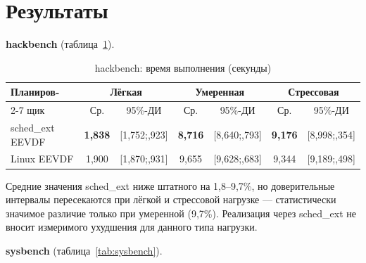 \documentclass[12pt, oneside]{book}
\newenvironment{customquote}
{\list{}{\leftmargin=0.5cm
                \rightmargin=0.5cm
                \topsep=0pt
                \partopsep=0pt
                \parsep=2pt
                \itemsep=0pt
        }%
        \normalfont\relax
\item\relax}
{\endlist}
\begin{document}
\section{Результаты}
\begin{customquote}
        \quad \textbf{hackbench}
        (таблица~\ref{tab:hackbench}).

        \begin{table}[!ht]
                \centering
                \caption{hackbench: время выполнения (секунды)}
                \label{tab:hackbench}
                \vspace{0.3em}
                \begin{tabular}{|l|c|c|c|c|c|c|}
                        \hline
                        Планиров- & \multicolumn{2}{c|}{Лёгкая}
                                  & \multicolumn{2}{c|}{Умеренная}
                                  & \multicolumn{2}{c|}{Стрессовая} \\
                        \cline{2-7}
                        щик & Ср. & 95\%-ДИ & Ср. & 95\%-ДИ & Ср. & 95\%-ДИ \\
                        \hline
                        sched\_ext EEVDF & \textbf{1,838} & {\scriptsize [1,752;\:1,923]}
                                   & \textbf{8,716} & {\scriptsize [8,640;\:8,793]}
                                   & \textbf{9,176} & {\scriptsize [8,998;\:9,354]} \\
                        Linux EEVDF & 1,900 & {\scriptsize [1,870;\:1,931]}
                                   & 9,655 & {\scriptsize [9,628;\:9,683]}
                                   & 9,344 & {\scriptsize [9,189;\:9,498]} \\
                        \hline
                \end{tabular}
        \end{table}

        \quad Средние значения sched\_ext ниже штатного
        на 1,8--9,7\%, но доверительные интервалы
        пересекаются при лёгкой и стрессовой нагрузке ---
        статистически значимое различие только при
        умеренной (9,7\%). Реализация через sched\_ext
        не вносит измеримого ухудшения для данного типа
        нагрузки.

        \quad \textbf{sysbench}
        (таблица~\ref{tab:sysbench}).


\end{customquote}
\end{document}
